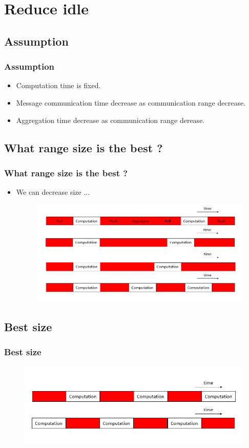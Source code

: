 
\section{Reduce idle}

\subsection{Assumption}
\begin{frame}  
    \frametitle{Assumption}
	\begin{itemize}
		\item Computation time is fixed. 
		\item Message communication time decrease as communication range decrease. 
		\item Aggregation time decrease as communication range derease. 
	\end{itemize}
\end{frame}

\subsection{What range size is the best ? }
\begin{frame}
    \frametitle{What range size is the best ?}
	\begin{itemize}
		\item We can decrease size ...
    	\begin{figure}
			\includegraphics[scale=0.3]{figure/diffsizetime.png}
		\end{figure}
	\end{itemize}
\end{frame}

\subsection{Best size}
\begin{frame}
    \frametitle{Best size}
    \begin{figure}
		\includegraphics[scale=0.3]{figure/besttime.png}
	\end{figure}
\end{frame}

